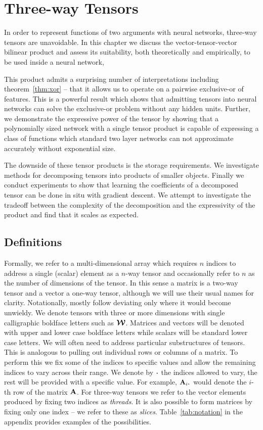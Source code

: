 
\chapter{Three-way Tensors}\label{C:tens}

In order to represent functions of two arguments with neural networks, three-way tensors are 
unavoidable. In this chapter we discuss the vector-tensor-vector bilinear product and assess its
suitability, both theoretically and empirically, to be used inside a neural network,

This product admits a surprising
number of interpretations including theorem~\ref{thm:xor} -- that it allows us to operate on a
pairwise exclusive-or of features. This is a powerful result which shows that admitting tensors
into neural networks can solve the exclusive-or problem without any hidden units. Further, we
demonstrate the expressive power of the tensor by showing that a polynomially sized network with a
single tensor product is capable of expressing a class of functions which standard two layer networks
can not approximate accurately without exponential size.

The downside of these tensor products is the storage requirements. We investigate methods for
decomposing tensors into products of smaller objects. Finally we conduct experiments to show that
learning the coefficients of a decomposed tensor can be done in situ with gradient descent. We attempt
to investigate the tradeoff between the complexity of the decomposition and the expressivity of the
product and find that it scales as expected.

\section{Definitions}
Formally, we refer to a multi-dimensional array which requires \(n\) indices to address a single
(scalar) element as a \(n\)-way tensor and occasionally refer to \(n\) as the number of dimensions of
the tensor. In this sense a matrix is a two-way tensor and a vector
a one-way tensor, although we will use their usual names for clarity. Notationally, mostly follow
\autocite{Kolda2009} deviating only where it would become unwieldy.
We denote tensors with three or more dimensions with single calligraphic boldface letters such
as \(\bm{\mathcal{W}}\). Matrices and vectors will be denoted with upper and lower case boldface letters
while scalars will be standard lower case letters. We will often need to address particular
substructures of tensors. This is analogous to pulling out individual rows or columns of a matrix.
To perform this we fix some of the indices to specific values and allow the remaining indices to vary
across their range. We denote by \(\midbullet\) the indices allowed to vary, the rest will be provided
with a specific value. For example, \(\mat{A}_{i \midbullet}\) would denote the \(i\)-th row of the
matrix \(\mathbf{A}\).
For three-way tensors we refer to the vector elements produced by fixing two indices as 
\emph{threads}. It is also possible to form matrices by fixing only one index -- we refer to these
as \emph{slices}. Table~\ref{tab:notation} in the appendix provides examples of the possibilities.


